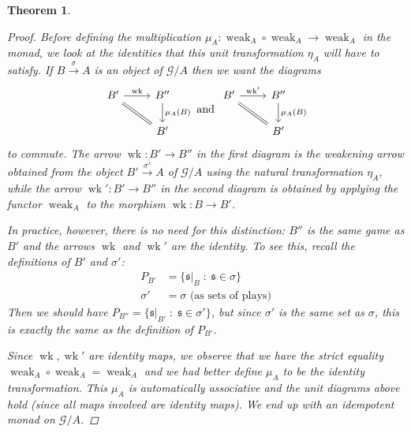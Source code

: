 \documentclass[11pt]{article} %
\theoremstyle{plain} %
\newtheorem{theorem}{Theorem}[section]
\theoremstyle{definition} %
\theoremstyle{exercisestyle}
\newcommand{\map}[3]{#2\xrightarrow{#1} #3}
\newcommand*\from{\colon}
\newcommand{\cmap}[3]{#1\from{}#2\to{}#3}
\newcommand{\comp}[2]{#1 \circ #2}
\newcommand{\G}{\mathcal G}
\newcommand{\suchthat}{\;\colon\;}
\DeclareMathOperator{\wk}{wk}
\DeclareMathOperator{\weak}{weak}
\newcommand{\s}{\mathfrak{s}}
\begin{document}
\begin{theorem}
\begin{proof}
   Before defining the multiplication $\cmap{\mu_A}{\comp{\weak_A}{\weak_A}}{\weak_A}$ in the monad, we look at the identities that this unit transformation $\eta_A$ will have to satisfy.  If $\map{\sigma}{B}{A}$ is an object of $\G/A$ then we want the diagrams
   \[
     \begin{tikzcd}
       B' \arrow[r, "\wk"] \arrow[dr, equals]
         & B'' \arrow[d, "\mu_A(B)"] \\
         & B'
     \end{tikzcd}
     \textrm{ and }
     \begin{tikzcd}
       B' \arrow[r, "\wk'"] \arrow[dr, equals]
         & B'' \arrow[d, "\mu_A(B)"] \\
         & B'
     \end{tikzcd}
     \]
   to commute.  The arrow $\cmap{\wk}{B'}{B''}$ in the first diagram is the weakening arrow obtained from the object $\map{\sigma'}{B'}{A}$ of $\G/A$ using the natural transformation $\eta_A$, while the arrow $\cmap{\wk'}{B'}{B''}$ in the second diagram is obtained by applying the functor $\weak_A$ to the morphism $\cmap{\wk}{B}{B'}$.  

   In practice, however, there is no need for this distinction: $B''$ is the same game as $B'$ and the arrows $\wk$ and $\wk'$ are the identity.  To see this, recall the definitions of $B'$ and $\sigma'$:
   \begin{align*}
     P_{B'} & = \{\s\vert_B\suchthat \s\in\sigma\} \\
     \sigma' & = \sigma\textrm{ (as sets of plays)}
   \end{align*}
   Then we should have $P_{B''} = \{\s\vert_{B'}\suchthat \s\in\sigma'\}$, but since $\sigma'$ is the same set as $\sigma$, this is exactly the same as the definition of $P_{B'}$.  

   Since $\wk,\wk'$ are identity maps, we observe that we have the strict equality $\comp{\weak_A}{\weak_A}=\weak_A$ and we had better define $\mu_A$ to be the identity transformation.  This $\mu_A$ is automatically associative and the unit diagrams above hold (since all maps involved are identity maps).  We end up with an idempotent monad on $\G/A$.
  \end{proof}
\end{theorem}
\end{document}
